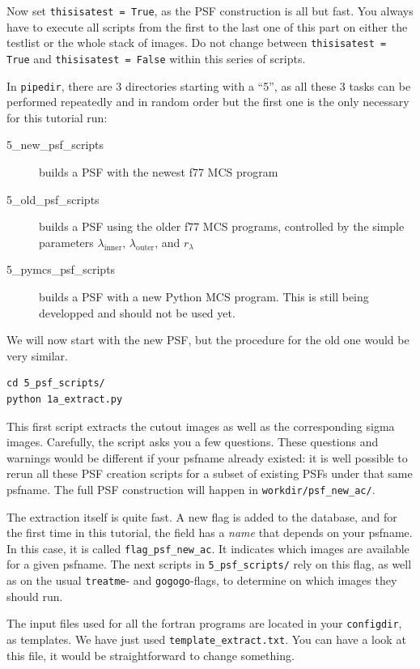 Now set  \verb+thisisatest = True+, as the PSF construction is all but fast. You always have to execute all scripts from the first to the last one of this part on either the testlist or the whole stack of images. Do not change between \verb+thisisatest = True+ and \verb+thisisatest = False+ within this series of scripts.

In \verb+pipedir+, there are 3 directories starting with a ``5'', as all these 3 tasks can be performed repeatedly and in random order but the first one is the only necessary for this tutorial run:
\begin{description}
\item[5\_new\_psf\_scripts] builds a PSF with the newest f77 MCS program
\item[5\_old\_psf\_scripts] builds a PSF using the older f77 MCS programs, controlled by the simple parameters $\lambda_{\mathrm{inner}}$, $\lambda_{\mathrm{outer}}$, and $r_{\lambda}$
\item[5\_pymcs\_psf\_scripts] builds a PSF with a new Python MCS program. This is still being developped and should not be used yet.
\end{description}
We will now start with the new PSF, but the procedure for the old one would be very similar.

\begin{Verbatim}
cd 5_psf_scripts/
python 1a_extract.py
\end{Verbatim}
This first script extracts the cutout images as well as the corresponding sigma images.
Carefully, the script asks you a few questions. These questions and warnings would be different if your psfname already existed: it is well possible to rerun all these PSF creation scripts for a subset of existing PSFs under that same psfname. The full PSF construction will happen in \verb+workdir/psf_new_ac/+.

The extraction itself is quite fast. A new flag is added to the database, and for the first time in this tutorial, the field has a \emph{name} that depends on your psfname. In this case, it is called \verb+flag_psf_new_ac+. It indicates which images are available for a given psfname. The next scripts in \verb+5_psf_scripts/+ rely on this flag, as well as on the usual \verb+treatme+- and \verb+gogogo+-flags, to determine on which images they should run.

The input files used for all the fortran programs are located in your \verb+configdir+, as templates. We have just used \verb+template_extract.txt+. You can have a look at this file, it would be straightforward to change something.

